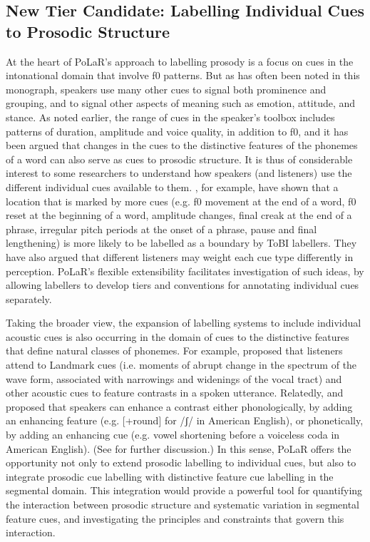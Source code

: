 \documentclass[11pt, twoside]{memoir}
\begin{document}
\subsection{New Tier Candidate: Labelling Individual Cues to Prosodic Structure}\label{sec:labelling-individual-cues}
At the heart of PoLaR’s approach to labelling prosody is a focus on cues in the intonational domain that involve f0 patterns.  But as has often been noted in this monograph, speakers use many other cues to signal both prominence and grouping, and to signal other aspects of meaning such as emotion, attitude, and stance. As noted earlier, the range of cues in the speaker’s toolbox includes patterns of duration, amplitude and voice quality, in addition to f0, and it has been argued that changes in the cues to the distinctive features of the phonemes of a word can also serve as cues to prosodic structure. It is thus of considerable interest to some researchers to understand how speakers (and listeners) use the different individual cues available to them.  \citet{brugos-18}, for example, have shown that a location that is marked by more cues (e.g. f0 movement at the end of a word, f0 reset at the beginning of a word, amplitude changes, final creak at the end of a phrase, irregular pitch periods at the onset of a phrase, pause and final lengthening) is more likely to be labelled as a boundary by ToBI labellers.  They have also argued that different listeners may weight each cue type differently in perception. PoLaR’s flexible extensibility facilitates investigation of such ideas, by allowing labellers to develop tiers and conventions for annotating individual cues separately. 

Taking the broader view,  the expansion of labelling systems to include individual acoustic cues is also occurring in the domain of cues to the distinctive features that define natural classes of phonemes.  For example, \citet{stevens02} proposed that listeners attend to Landmark cues (i.e. moments of abrupt change in the spectrum of the wave form, associated with narrowings and widenings of the vocal tract) and other acoustic cues to feature contrasts in a spoken utterance.  Relatedly, \citet{stevenskeyser89} and \citet{keyserstevens01} proposed that speakers can enhance a contrast either phonologically, by adding an enhancing feature (e.g. [+round] for /ʃ/ in American English), or phonetically, by adding an enhancing cue (e.g. vowel shortening before a voiceless coda in American English).  (See \citealt{clements09} for further discussion.)   In this sense, PoLaR offers the opportunity not only to extend prosodic labelling to individual cues, but also to integrate prosodic cue labelling with distinctive feature cue labelling in the segmental domain.  This integration would provide a powerful tool for quantifying the interaction between prosodic structure and systematic variation in segmental feature cues, and investigating the principles and constraints that govern this interaction.  
\end{document}
